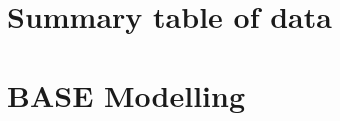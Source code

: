 

\newpage
\begin{appendices}
    \appendix

    \section[Data Table]{Summary table of data} \label{appx:data}

    \section[BASE Model]{BASE Modelling} \label{appx:base}

\end{appendices}